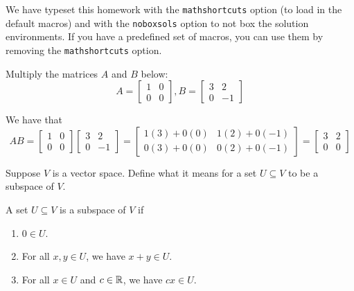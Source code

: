 \documentclass[mathshortcuts, noboxsols]{homework}
\begin{document}
		\maketitle
		We have typeset this homework with the \texttt{mathshortcuts} option (to load in the default macros) and with the \texttt{noboxsols} option to not box the solution environments. If you have a predefined set of macros, you can use them by removing the \texttt{mathshortcuts} option.

		\begin{problem}
				Multiply the matrices $A$ and $B$ below:
				\begin{equation*}
						A = \begin{bmatrix}
								1 & 0 \\ 0 & 0
						\end{bmatrix}, B = \begin{bmatrix}
								3 & 2 \\ 0 & -1
						\end{bmatrix}
				\end{equation*}
		\end{problem}
		\begin{soln}
				 We have that 
				 \begin{equation}
				 		AB = \begin{bmatrix}
								1 & 0 \\ 0 & 0
						\end{bmatrix}\begin{bmatrix}
								3 & 2 \\ 0 & -1
						\end{bmatrix} = \begin{bmatrix}
								1(3) + 0(0) & 1(2) + 0(-1)  \\ 
								0(3) + 0(0) & 0(2) + 0(-1)
						\end{bmatrix} = \begin{bmatrix}
								3 & 2 \\ 0 & 0
						\end{bmatrix}
				 \end{equation}
		\end{soln}

		\begin{problem}
				Suppose $V$ is a vector space. Define what it means for a set $U \subseteq V$ to be a subspace of $V$.
		\end{problem}
		\begin{soln}
				A set $U \subseteq V$ is a subspace of $V$ if
				\begin{enumerate}
						\item $0\in U$. 
						\item For all $x,y\in U$, we have $x+y\in U$. 
						\item For all $x\in U$ and $c\in \mathbb{R}$, we have $cx \in U$.
				\end{enumerate}
		\end{soln}
\end{document}
